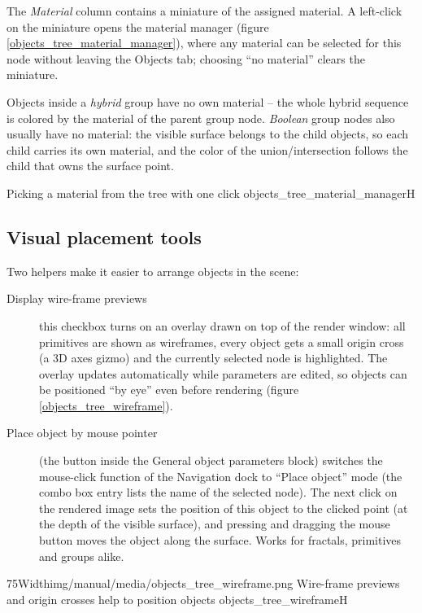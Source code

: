 The \emph{Material} column contains a miniature of the assigned material. A left-click on the
miniature opens the material manager (figure \ref{objects_tree_material_manager}), where any
material can be selected for this node without leaving the Objects tab; choosing ``no material''
clears the miniature.

Objects inside a \emph{hybrid} group have no own material -- the whole hybrid sequence is colored
by the material of the parent group node. \emph{Boolean} group nodes also usually have no material:
the visible surface belongs to the child objects, so each child carries its own material, and the
color of the union/intersection follows the child that owns the surface point.

{Picking a material from the tree with one click}
{objects_tree_material_manager}{H}

\subsection{Visual placement tools}\label{objects-tree-visual-tools}

Two helpers make it easier to arrange objects in the scene:

\begin{description}
	\item[Display wire-frame previews] this checkbox turns on an overlay drawn on top of the render
	window: all primitives are shown as wireframes, every object gets a small origin cross (a 3D
	axes gizmo) and the currently selected node is highlighted. The overlay updates automatically
	while parameters are edited, so objects can be positioned ``by eye'' even before rendering
	(figure \ref{objects_tree_wireframe}).
	\item[Place object by mouse pointer] (the button inside the General object parameters block)
	switches the mouse-click function of the Navigation dock to ``Place object'' mode (the combo box
	entry lists the name of the selected node). The
	next click on the rendered image sets the position of this object to the clicked point (at the
	depth of the visible surface), and pressing and dragging the mouse button moves the object
	along the surface. Works for fractals, primitives and groups alike.
\end{description}

\simpleImageWithCaption75Width{img/manual/media/objects_tree_wireframe.png}
{Wire-frame previews and origin crosses help to position objects}
{objects_tree_wireframe}{H}

